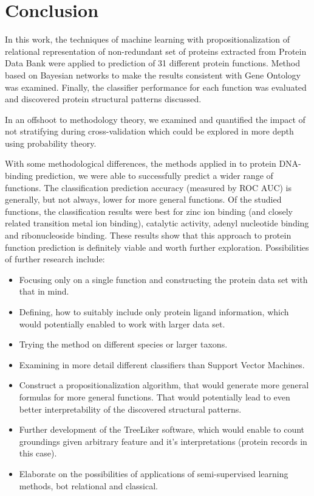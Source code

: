 \documentclass[11pt,twoside,a4paper]{book}
\begin{document}
 
\chapter{Conclusion}
\label{ch:conclusion}
In this work,
the techniques of machine learning with propositionalization \cite{kuzelka}
of relational representation of non-redundant set \cite{maxind} of proteins 
extracted from Protein Data Bank \cite{pdb}
were applied to prediction of 31 different protein functions.
Method based on Bayesian networks \cite{bnet} to make the results 
consistent with Gene Ontology \cite{go} was examined.
Finally, the classifier performance for each function was evaluated
and discovered protein structural patterns discussed.

In an offshoot to methodology theory,
we examined and quantified the impact of not stratifying
during cross-validation which could 
be explored in more depth using probability theory.

With some methodological differences,
the methods applied in \cite{szabova} to protein DNA-binding
prediction, we were able to successfully predict a wider
range of functions.
The classification prediction accuracy (measured by ROC AUC)
is generally, but not always,
lower for more general functions. 
Of the studied functions,
the classification results were best for
zinc ion binding (and closely related transition metal ion binding),
catalytic activity, adenyl nucleotide binding and ribonucleoside binding.
These results show that this approach to protein function prediction
is definitely viable and worth further exploration.
Possibilities of further research include:
\begin{itemize}
 \item Focusing only on a single function and constructing the protein data set with that in mind. 
 \item Defining, how to suitably include only protein ligand information, which would potentially enabled to work with larger data set.
 \item Trying the method on different species or larger taxons.
 \item Examining in more detail different classifiers than Support Vector Machines.
 \item Construct a propositionalization algorithm, that would generate more general formulas for more general functions. 
 That would potentially lead to even better interpretability of the discovered structural patterns.
 \item Further development of the TreeLiker software, which would enable to count groundings given arbitrary feature and it's interpretations (protein records in this case).
 \item Elaborate on the possibilities of applications of semi-supervised learning methods, bot relational and classical.
\end{itemize}
\end{document}
